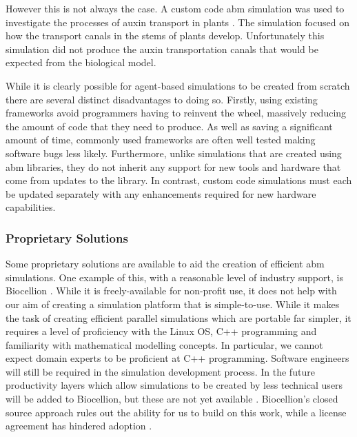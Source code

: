 \documentclass{UoYCSproject}
\begin{document}
However this is not always the case.
A custom code \gls{abm} simulation was used to investigate the processes of auxin transport in plants \cite{stepney_abm}.
The simulation focused on how the transport canals in the stems of plants develop.
Unfortunately this simulation did not produce the auxin transportation canals that would be expected from the biological model.

While it is clearly possible for agent-based simulations to be created from scratch there are several distinct disadvantages to doing so.
Firstly, using existing frameworks avoid programmers having to reinvent the wheel, massively reducing the amount of code that they need to produce.
As well as saving a significant amount of time, commonly used frameworks are often well tested making software bugs less likely.
Furthermore, unlike simulations that are created using \gls{abm} libraries, they do not inherit any support for new tools and hardware that come from updates to the library.
In contrast, custom code simulations must each be updated separately with any enhancements required for new hardware capabilities.

\subsubsection{Proprietary Solutions}
Some proprietary solutions are available to aid the creation of efficient \gls{abm} simulations.
One example of this, with a reasonable level of industry support, is Biocellion \cite{biocellion_paper}.
While it is freely-available for non-profit use, it does not help with our aim of creating a simulation platform that is simple-to-use.
While it makes the task of creating efficient parallel simulations which are portable far simpler, it requires a level of proficiency with the Linux OS, C++ programming and familiarity with mathematical modelling concepts.
In particular, we cannot expect domain experts to be proficient at C++ programming.
Software engineers will still be required in the simulation development process.
In the future productivity layers which allow simulations to be created by less technical users will be added to Biocellion, but these are not yet available \cite{biocellion_paper}.
Biocellion's closed source approach rules out the ability for us to build on this work, while a license agreement has hindered adoption \cite{physicell}.

\end{document}
